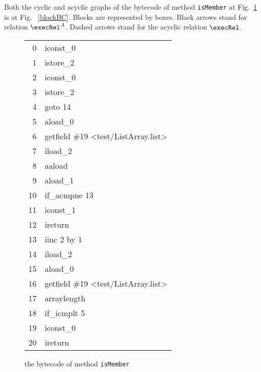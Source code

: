 


Both the cyclic and acyclic graphs of the bytecode of method \texttt{isMember} at Fig.~\ref{isMemBC} is at Fig. ~\ref{blockBC}. Blocks are represented by boxes. Black arrows stand for relation $\execRel^A$. Dashed arrows stand for the acyclic relation $\execRel$.





\begin{figure}[p]
\begin{center}
\begin{tabular}{rl}
 0 & iconst\_0 \\
 1 & istore\_2 \\
 2 & iconst\_0 \\
 3 & istore\_2 \\
 4 & goto 14 \\
 5 & aload\_0 \\
 6 & getfield \#19 <test/ListArray.list> \\
 7 & iload\_2 \\
 8 & aaload \\
 9 & aload\_1 \\
10 & if\_acmpne 13 \\
11 & iconst\_1 \\
12 & ireturn \\
13 & iinc 2 by 1 \\
14 & iload\_2 \\
15 & aload\_0 \\
16 & getfield \#19 <test/ListArray.list> \\
17 & arraylength \\
18 & if\_icmplt 5  \\
19 & iconst\_0 \\
20 & ireturn \\
\end{tabular}
\end{center}
\caption{the bytecode of method \texttt{isMember}}
\label{isMemBC}
\end{figure}
